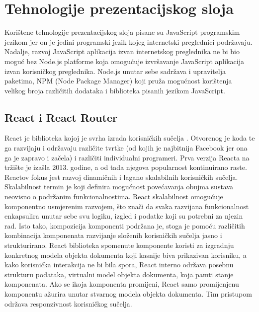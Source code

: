 \documentclass[times, utf8, zavrsni]{fer}
\begin{document}
		\section{Tehnologije prezentacijskog sloja}
		Korištene tehnologije prezentacijskog sloja pisane su JavaScript programskim jezikom jer on je jedini programski jezik kojeg internetski preglednici podržavaju. Nadalje, razvoj JavaScript aplikacija izvan internetskog preglednika ne bi bio moguć bez Node.js platforme koja omogućuje izvršavanje JavaScript aplikacija izvan korisničkog preglednika. Node.js unutar sebe sadržava i upravitelja paketima, NPM (Node Package Manager) koji pruža mogućnost korištenja velikog broja različitih dodataka i biblioteka pisanih jezikom JavaScript.
		
			\subsection{React i React Router}
			React je biblioteka kojoj je svrha izrada korisničkih sučelja . Otvorenog je koda te ga razvijaju i održavaju različite tvrtke (od kojih je najbitnija Facebook jer ona ga je zapravo i začela) i različiti individualni programeri. Prva verzija Reacta na tržište je izašla 2013. godine, a od tada njegova popularnost kontinuirano raste. Reactov fokus jest razvoj dinamičnih i lagano skalabilnih korisničkih sučelja. Skalabilnost  termin je koji definira mogućnost povećavanja obujma sustava neovisno o podržanim funkcionalnostima. React skalabilnost omogućuje komponentno usmjerenim razvojem, što znači da svaka razvijana funkcionalnost enkapsulira unutar sebe svu logiku, izgled i podatke koji su potrebni za njezin rad. Isto tako, kompozicija komponenti podržana je, stoga je pomoću različitih kombinacija komponenata razvijanje složenih korisničkih sučelja jasno i strukturirano. React biblioteka spomenute komponente koristi za izgradnju konkretnog modela objekta dokumenta  koji kasnije biva prikazivan korisniku, a kako korisnička interakcija ne bi bila spora, React interno održava posebnu strukturu podataka, virtualni model objekta dokumenta, koja pamti stanje komponenata. Ako se ikoja komponenta promijeni, React samo promijenjenu komponentu ažurira unutar stvarnog modela objekta dokumenta. Tim pristupom održava responzivnost korisničkog sučelja.\\
\end{document}
